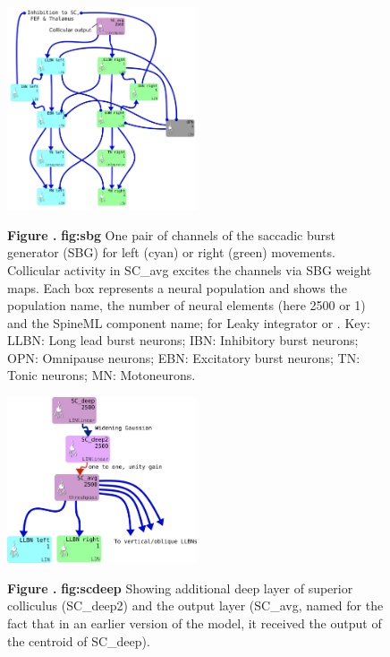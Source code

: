 \documentclass{frontiersSCNS}
\begin{document}
\begin{figure}[htb!]
\begin{center}
\includegraphics[width=0.5\textwidth]{./figures/Brain_Stem_1channel.png}
\end{center}
\textbf{\label{fig:sbg} Figure .}
{ \textbf{fig:sbg} One pair of channels of the saccadic burst
generator (SBG) for left (cyan) or right (green) movements. Collicular
activity in SC\_avg excites the channels via SBG weight maps. Each box
represents a neural population and shows the population name, the
number of neural elements (here 2500 or 1) and the SpineML component
name;  for Leaky integrator or . Key: LLBN:
Long lead burst neurons; IBN: Inhibitory burst neurons; OPN: Omnipause
neurons; EBN: Excitatory burst neurons; TN: Tonic neurons; MN:
Motoneurons.}
\end{figure}

\begin{figure}[htb!]
\begin{center}
\includegraphics[width=0.5\textwidth]{./figures/SC_to_brainstem.png}
\end{center}
\textbf{\label{fig:scdeep} Figure .}
{ \textbf{fig:scdeep} Showing additional deep layer of superior colliculus 
(SC\_deep2) and the output layer (SC\_avg, named for the fact that in an earlier
version of the model, it received the output of the centroid of SC\_deep).}
\end{figure}
\end{document}
